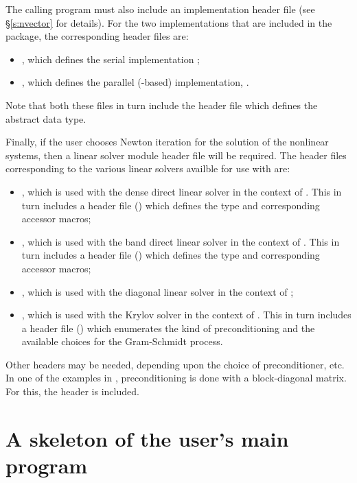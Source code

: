 The calling program must also include an {\nvector} implementation header file
(see \S\ref{s:nvector} for details).
For the two {\nvector} implementations that are included in the {\cvodes} package,
the corresponding header files are:
\begin{itemize}
\item {}, 
  which defines the serial implementation {\nvecs};
\item {}, 
  which defines the parallel ({\mpi}-based) implementation, {\nvecp}.
\end{itemize}
Note that both these files in turn include the header file  which 
defines the abstract  data type. 

Finally, if the user chooses Newton iteration for the solution of the nonlinear systems,
then a linear solver module header file will be required. 
The header files corresponding to the various linear solvers availble for use
with {\cvodes} are:
\begin{itemize}
\item {}, 
  which is used with the dense direct linear solver in 
  the context of {\cvodes}. This in turn includes a header file ()
  which defines the  type and corresponding accessor macros; 
\item {}, 
  which is used with the band direct linear solver in the
  context of {\cvodes}. This in turn includes a header file ()
  which defines the  type and corresponding accessor macros;
\item {}, which is used with the diagonal linear solver in the
  context of {\cvodes};
\item {}, 
  which is used with the Krylov solver {\spgmr} in the
  context of {\cvodes}. This in turn includes a header file ()
  which enumerates the kind of preconditioning and the available choices for the
  Gram-Schmidt process.
\end{itemize}

Other headers may be needed, depending upon the choice of
preconditioner, etc. In one of the examples in \cite{cvodes2.1.0_ex}, preconditioning
is done with a block-diagonal matrix. For this, the header
 is included.

\section{A skeleton of the user's main program}\label{ss:skeleton_sim}

